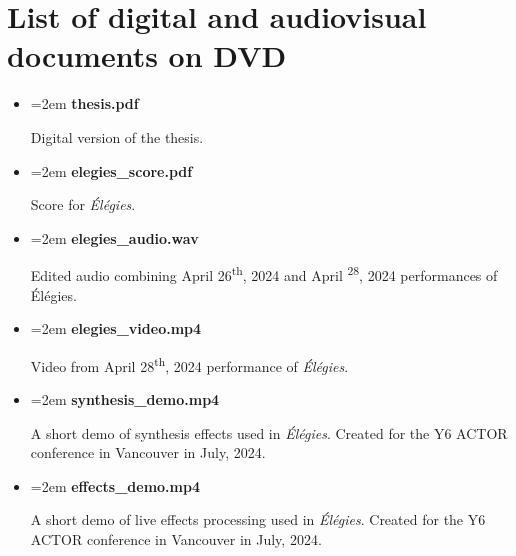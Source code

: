 \documentclass[12pt,twoside,maitrise]{dms_ks}
\theoremstyle{definition}
\begin{document}
{{\appendix
\chapter{List of digital and audiovisual documents on DVD}


\begin{itemize}
    \setlength\itemsep{0.5em}  %
    \setlength\parskip{0pt}    %
    \setlength\parsep{0pt}
    \setlength\leftskip{0pt}   %
    \setlength{\labelsep}{0pt} %
    \renewcommand{\labelitemi}{} %
    \renewcommand{\labelitemii}{} %

    \item \hangindent=2em \textbf{thesis.pdf}
    \par Digital version of the thesis.
     
    \item \hangindent=2em \textbf{elegies\_score.pdf}
    \par Score for \textit{Élégies}.
    
    \item \hangindent=2em \textbf{elegies\_audio.wav}
    \par Edited audio combining April 26\textsuperscript{th}, 2024 and April \textsuperscript{28}, 2024 performances of Élégies.
    
    \item \hangindent=2em \textbf{elegies\_video.mp4}
    \par Video from April 28\textsuperscript{th}, 2024 performance of \textit{Élégies}.
    
    \item \hangindent=2em \textbf{synthesis\_demo.mp4}
    \par A short demo of synthesis effects used in \textit{Élégies}. Created for the Y6 ACTOR conference in Vancouver in July, 2024.
    
    \item \hangindent=2em \textbf{effects\_demo.mp4}
    \par A short demo of live effects processing used in \textit{Élégies}. Created for the Y6 ACTOR conference in Vancouver in July, 2024.


\end{itemize}}}
\end{document}
